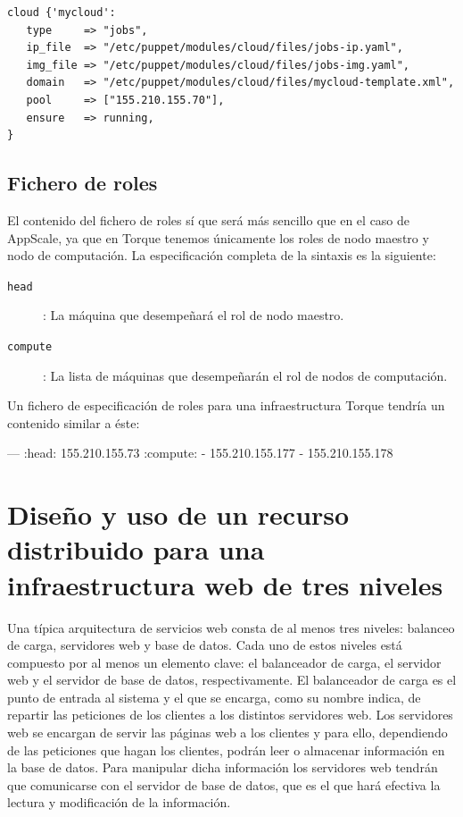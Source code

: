 \begin{lstlisting}
cloud {'mycloud':
   type     => "jobs",
   ip_file  => "/etc/puppet/modules/cloud/files/jobs-ip.yaml",
   img_file => "/etc/puppet/modules/cloud/files/jobs-img.yaml",
   domain   => "/etc/puppet/modules/cloud/files/mycloud-template.xml",
   pool     => ["155.210.155.70"],
   ensure   => running,
}
\end{lstlisting}

\subsection{Fichero de roles}

El contenido del fichero de roles sí que será más sencillo que en el caso de AppScale, ya que en Torque tenemos únicamente los roles de nodo maestro y nodo de computación. La especificación completa de la sintaxis es la siguiente:

\begin{description}
\item[\texttt{head}]: La máquina que desempeñará el rol de nodo maestro.
\item[\texttt{compute}]: La lista de máquinas que desempeñarán el rol de nodos de computación.
\end{description}

Un fichero de especificación de roles para una infraestructura Torque tendría un contenido similar a éste:
\begin{yamlcode}
--- 
:head: 155.210.155.73
:compute:
- 155.210.155.177
- 155.210.155.178
\end{yamlcode}


\section{Diseño y uso de un recurso distribuido para una infraestructura web de tres niveles}

Una típica arquitectura de servicios web consta de al menos tres niveles: balanceo de carga, servidores web y base de datos. Cada uno de estos niveles está compuesto por al menos un elemento clave: el balanceador de carga, el servidor web y el servidor de base de datos, respectivamente. El balanceador de carga es el punto de entrada al sistema y el que se encarga, como su nombre indica, de repartir las peticiones de los clientes a los distintos servidores web. Los servidores web se encargan de servir las páginas web a los clientes y para ello, dependiendo de las peticiones que hagan los clientes, podrán leer o almacenar información en la base de datos. Para manipular dicha información los servidores web tendrán que comunicarse con el servidor de base de datos, que es el que hará efectiva la lectura y modificación de la información.\\

